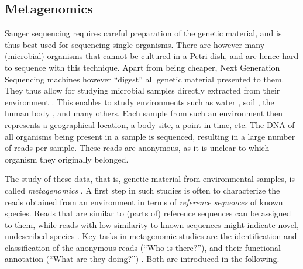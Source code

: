 \subsection{Metagenomics}
\label{ch:Foundations:sec:SequenceAnalysis:sub:Metagenomics}

Sanger sequencing requires careful preparation of the genetic material,
and is thus best used for sequencing single organisms.
There are however many (microbial) organisms that cannot be cultured in a Petri dish,
and are hence hard to sequence with this technique.
Apart from being cheaper, Next Generation Sequencing machines however ``digest'' all genetic material presented to them.
They thus allow for studying microbial samples
directly extracted from their environment \citep{Morgan2010,Edwards2013,Sunagawa2013a}.
This enables to study environments such as
water \cite{Karsenti2011,Giner2016,Gran-Stadniczenko2017},
soil \cite{Dupont2016,Mahe2017},
the human body \cite{Huttenhower2012,Methe2012,Srinivasan2012,Matsen2015},
and many others.
Each sample from such an environment then represents a geographical location, a body site, a point in time, etc.
The DNA of all organisms being present in a sample is sequenced,
resulting in a large number of reads per sample.
These reads are anonymous, as it is unclear to which organism they originally belonged.

The study of these data, that is, genetic material from environmental samples, is called \emph{metagenomics} \cite{Oulas2015}.
A first step in such studies is often to characterize the reads obtained from an environment
in terms of \emph{reference sequences} of known species.
Reads that are similar to (parts of) reference sequences can be assigned to them,
while reads with low similarity to known sequences might indicate novel, undescribed species \cite{Temperton2012}.
Key tasks in metagenomic studies are the identification and classification of the anonymous reads (``Who is there?''),
and their functional annotation (``What are they doing?'') \cite{Desai2012}.
Both are introduced in the following.


